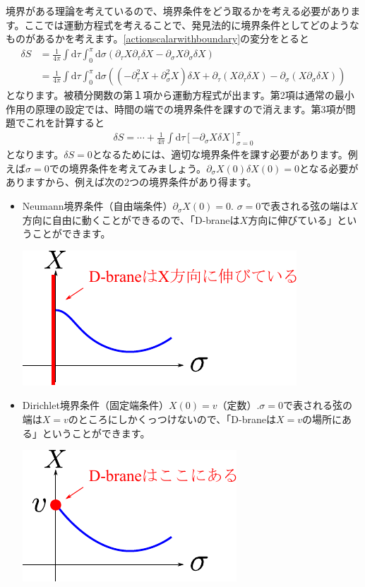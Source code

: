 \documentclass[report,paper=a4, fontsize=12pt, line_length=16cm, number_of_lines=34,dvipdfmx]{jlreq}
\numberwithin{equation}{chapter}
\numberwithin{equation}{section}
\newcommand{\del}{\partial}
\newcommand{\di}{\mathrm{d}}
\begin{document}
境界がある理論を考えているので、境界条件をどう取るかを考える必要があります。ここでは運動方程式を考えることで、発見法的に境界条件としてどのようなものがあるかを考えます。\eqref{actionscalarwithboundary}の変分をとると
\begin{align}
  \delta S&
  =\frac{1}{4\pi}\int \di \tau \int_{0}^{\pi}\di \sigma \left( \del_{\tau}X\del_{\tau}\delta X - \del_{\sigma}X\del_{\sigma}\delta X \right)\nonumber\\
  &=\frac{1}{4\pi}\int \di \tau \int_{0}^{\pi}\di \sigma \left( (-\del_{\tau}^2X+\del_{\sigma}^2X)\delta X+\del_{\tau}(X\del_{\tau}\delta X) - \del_{\sigma}(X\del_{\sigma}\delta X) \right)
\end{align}
となります。被積分関数の第１項から運動方程式が出ます。第2項は通常の最小作用の原理の設定では、時間の端での境界条件を課すので消えます。第3項が問題でこれを計算すると
\begin{align}
  \delta S = \cdots +\frac{1}{4\pi}\int \di \tau [-\del_{\sigma}X \delta X]_{\sigma=0}^{\pi}
\end{align}
となります。$\delta S=0$となるためには、適切な境界条件を課す必要があります。例えば$\sigma=0$での境界条件を考えてみましょう。$\del_{\sigma}X(0)\delta X(0)=0$となる必要がありますから、例えば次の2つの境界条件があり得ます。
\begin{itemize}
  \item Neumann境界条件（自由端条件）$\del_{\sigma} X(0)=0$. $\sigma=0$で表される弦の端は$X$方向に自由に動くことができるので、「D-braneは$X$方向に伸びている」ということができます。\\
  \begin{center}
    \includegraphics{NBC.pdf}    
  \end{center}
  \item Dirichlet境界条件（固定端条件）$X(0)=v$（定数）.$\sigma=0$で表される弦の端は$X=v$のところにしかくっつけないので、「D-braneは$X=v$の場所にある」ということができます。\\
  \begin{center}
    \includegraphics{DBC.pdf}    
  \end{center}
\end{itemize}
\end{document}

